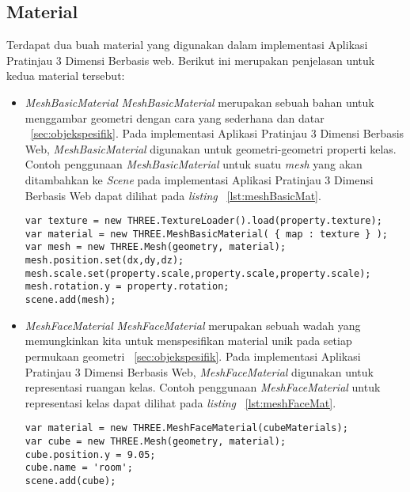 \subsection{Material}
Terdapat dua buah material yang digunakan dalam implementasi Aplikasi Pratinjau 3 Dimensi Berbasis web. Berikut ini merupakan penjelasan untuk kedua material tersebut:
\begin{itemize}
	\item {\it MeshBasicMaterial}
{\it MeshBasicMaterial} merupakan sebuah bahan untuk menggambar geometri dengan cara yang sederhana dan datar ~\ref{sec:objekspesifik}. Pada implementasi Aplikasi Pratinjau 3 Dimensi Berbasis Web, {\it MeshBasicMaterial} digunakan untuk geometri-geometri properti kelas. Contoh penggunaan {\it MeshBasicMaterial} untuk suatu {\it mesh} yang akan ditambahkan ke {\it Scene} pada implementasi Aplikasi Pratinjau 3 Dimensi Berbasis Web dapat dilihat pada {\it listing} ~\ref{lst:meshBasicMat}.
\begin{lstlisting}[caption={Contoh penggunaan {\it MeshBasicMaterial}}, label={lst:meshBasicMat},captionpos=b]
var texture = new THREE.TextureLoader().load(property.texture);
var material = new THREE.MeshBasicMaterial( { map : texture } ); 
var mesh = new THREE.Mesh(geometry, material);
mesh.position.set(dx,dy,dz);
mesh.scale.set(property.scale,property.scale,property.scale);
mesh.rotation.y = property.rotation;
scene.add(mesh);
\end{lstlisting}

	\item {\it MeshFaceMaterial}
{\it MeshFaceMaterial} merupakan sebuah wadah yang memungkinkan kita untuk menspesifikan material unik pada setiap permukaan geometri ~\ref{sec:objekspesifik}. Pada implementasi Aplikasi Pratinjau 3 Dimensi Berbasis Web, {\it MeshFaceMaterial} digunakan untuk representasi ruangan kelas. Contoh penggunaan {\it MeshFaceMaterial} untuk representasi kelas dapat dilihat pada {\it listing} ~\ref{lst:meshFaceMat}.
\begin{lstlisting}[caption={Contoh penggunaan {\it MeshFaceMaterial}}, label={lst:meshFaceMat},captionpos=b]
var material = new THREE.MeshFaceMaterial(cubeMaterials);
var cube = new THREE.Mesh(geometry, material);
cube.position.y = 9.05;
cube.name = 'room';
scene.add(cube);
\end{lstlisting}
\end{itemize}

